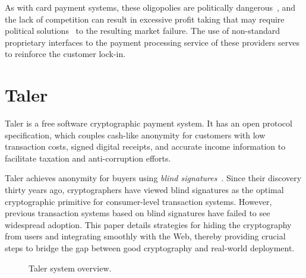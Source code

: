 \documentclass{IEEEtran}
\begin{document}
As with card payment systems, these oligopolies are politically
dangerous~\cite{crinkey2011rundle}, and the lack of competition can
result in excessive profit taking that may require political
solutions~\cite{guardian2015cap} to the resulting market failure.  The
use of non-standard proprietary interfaces to the payment processing
service of these providers serves to reinforce the customer lock-in.


\section{Taler}

Taler is a free software cryptographic payment system. It has an open
protocol specification, which couples cash-like anonymity for customers
with low transaction costs, signed digital
receipts, and accurate income information to facilitate taxation and
anti-corruption efforts.

Taler achieves anonymity for buyers using {\em blind
signatures}~\cite{chaum1983blind}.  Since their discovery thirty years
ago, cryptographers have viewed blind signatures as the optimal
cryptographic primitive for consumer-level transaction systems.
However, previous transaction systems based on blind signatures have
failed to see widespread adoption.  This paper details strategies for
hiding the cryptography from users and integrating smoothly with the
Web, thereby providing crucial steps to bridge the gap between good
cryptography and real-world deployment.


\begin{figure}[b!]
\centering
{}
\caption{Taler system overview.}
\label{fig:system}
\end{figure}
\end{document}
